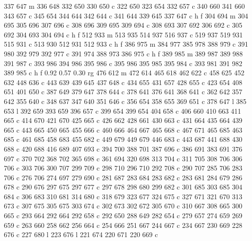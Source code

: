 {{        337 647 m
        336 648 332 650 330 650 c
        322 650 323 654 332 657 c
        340 660 341 660 343 657 c
        345 654 344 644 342 644 c
        341 644 339 645 337 647 c
        h f
        304 694 m
        304 695 305 696 307 696 c
        308 696 309 695 309 694 c
        308 693 307 692 306 692 c
        305 692 304 693 304 694 c
        h f
        512 933 m
        513 935 514 937 516 937 c
        519 937 519 931 515 931 c
        513 930 512 931 512 933 c
        h f
        386 975 m
        384 977 385 978 388 979 c
        391 980 392 979 392 977 c
        391 974 388 973 386 975 c
        h f
        389 985 m
        389 987 389 988 391 987 c
        393 986 394 986 395 986 c
        395 986 395 985 395 984 c
        393 981 391 982 389 985 c
        h f
        0.92 0.57 0.30 rg
        476 612 m
        472 614 465 618 462 622 c
        458 625 452 632 448 636 c
        443 639 439 645 437 648 c
        434 655 431 657 428 655 c
        423 654 408 651 401 650 c
        387 649 379 647 378 644 c
        378 641 376 641 368 641 c
        362 642 357 642 355 640 c
        348 637 347 640 351 646 c
        356 654 358 655 369 651 c
        378 647 l
        385 653 l
        392 659 393 659 396 657 c
        399 654 399 654 404 658 c
        406 660 410 663 411 665 c
        414 670 421 670 425 665 c
        426 662 428 661 430 663 c
        431 664 435 664 439 665 c
        443 665 450 665 455 666 c
        460 666 464 667 465 668 c
        467 671 465 685 463 685 c
        461 685 458 683 455 682 c
        449 679 449 679 446 683 c
        443 687 441 688 430 688 c
        420 688 416 689 407 693 c
        394 700 388 701 387 696 c
        386 691 383 691 376 697 c
        370 702 368 702 365 698 c
        361 694 320 698 313 704 c
        311 705 308 706 306 706 c
        303 706 300 707 299 709 c
        298 710 296 710 292 708 c
        290 707 285 706 283 706 c
        276 706 274 697 279 690 c
        281 687 283 684 283 682 c
        283 681 284 679 286 678 c
        290 676 297 675 297 677 c
        297 678 298 680 299 682 c
        301 685 303 685 304 684 c
        306 683 310 681 314 680 c
        318 679 323 677 324 675 c
        327 671 321 670 313 673 c
        307 675 305 675 303 674 c
        302 673 302 672 305 670 c
        310 667 308 665 300 665 c
        293 664 292 664 292 658 c
        292 650 288 649 282 654 c
        279 657 274 659 269 659 c
        263 660 258 662 256 664 c
        254 666 251 667 244 667 c
        234 667 230 669 228 676 c
        227 680 l
        223 676 l
        221 674 220 671 220 669 c
}}
